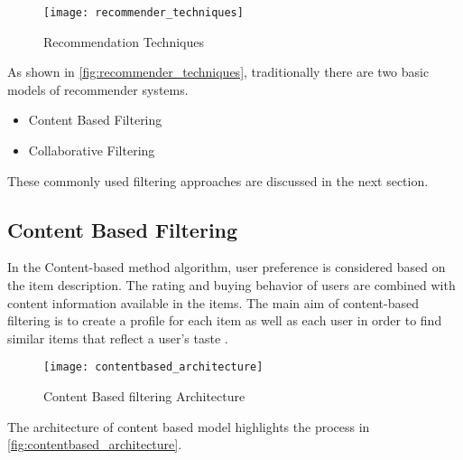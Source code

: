 \begin{figure}[H]
	\centering
	\texttt{[image: recommender\_techniques]}
	\caption{Recommendation Techniques \cite{33}}
	\label{fig:recommender_techniques}
\end{figure}


\noindent As shown in \autoref{fig:recommender_techniques}, traditionally there are two basic models of recommender systems. \begin{itemize} \item Content Based Filtering \item Collaborative Filtering \end{itemize}
These commonly used filtering approaches are discussed in the next section.
\pagebreak

\subsection{Content Based Filtering}
In the Content-based method algorithm, user preference is considered based on the item description. The rating and buying behavior of users are combined with content information available in the items. The main aim of content-based filtering is to create a profile for each item as well as each user in order to find similar items that reflect a user's taste \cite{6}.
\\

\begin{figure}[H]
	\centering
	\texttt{[image: contentbased\_architecture]}
	\caption{Content Based filtering Architecture \cite{5}}
	\label{fig:contentbased_architecture}
\end{figure}

\noindent 
The architecture of content based model highlights the process in \autoref{fig:contentbased_architecture}. 


